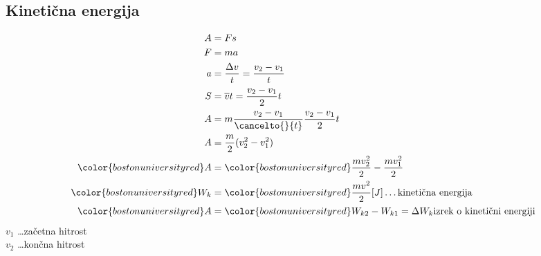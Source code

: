 {\color{indiagreen}\subsection{Kinetična energija}}
\begin{align*}
	A &= Fs\\
	F &= ma\\
	a &= \frac{\Delta v}{t} = \frac{v_2-v_1}{t}\\
	S &= \overline{v}t = \frac{v_2-v_1}{2}t\\
	A &= m\frac{v_2-v_1}{\cancelto{}{t}}\frac{v_2-v_1}{2}t\\
	A &= \frac{m}{2}(v_2^2-v_1^2)\\
	{\color{bostonuniversityred}A} &= {\color{bostonuniversityred}\frac{mv_2^2}{2} - \frac{mv_1^2}{2}}\\
	{\color{bostonuniversityred}W_k} &= {\color{bostonuniversityred}\frac{mv^2}{2}}[J] \dots \text{kinetična energija}\\
	{\color{bostonuniversityred}A} &= {\color{bostonuniversityred}W_{k2} - W_{k1} = \Delta W_k} \text{izrek o kinetični energiji}\\
\end{align*}
$v_1$ \dots začetna hitrost\\
$v_2$ \dots končna hitrost\\
